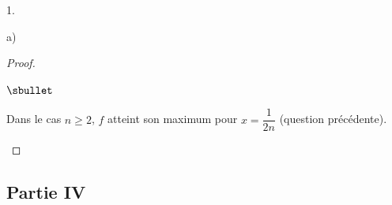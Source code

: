 \begin{noliste}{1.}
\begin{noliste}{a)}
\begin{proof}
\begin{noliste}{$\sbullet$}
      \item Dans le cas $n \geq 2$, $f$ atteint son maximum pour $x =
        \dfrac{1}{2n}$ (\cf question précédente). %
        ~\\[-1.2cm]
      \end{noliste}
    \end{proof}
  \end{noliste}
\end{noliste}


\newpage


\subsection*{Partie IV}

